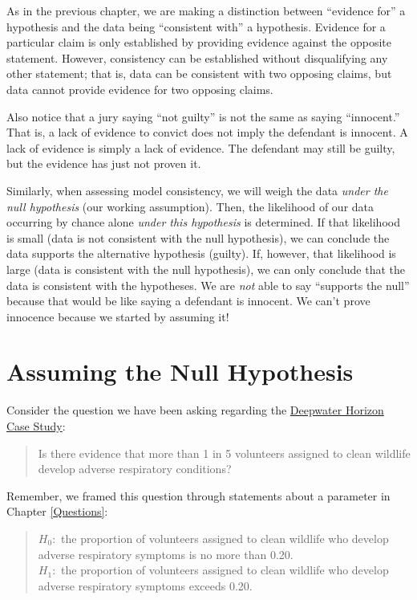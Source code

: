 \documentclass[]{book}
\theoremstyle{plain}
\theoremstyle{mydefn}
\theoremstyle{myexmpl}
\theoremstyle{remark}
\begin{document}
As in the previous chapter, we are making a distinction between
``evidence for'' a hypothesis and the data being ``consistent with'' a
hypothesis. Evidence for a particular claim is only established by
providing evidence against the opposite statement. However, consistency
can be established without disqualifying any other statement; that is,
data can be consistent with two opposing claims, but data cannot provide
evidence for two opposing claims.

Also notice that a jury saying ``not guilty'' is not the same as saying
``innocent.'' That is, a lack of evidence to convict does not imply the
defendant is innocent. A lack of evidence is simply a lack of evidence.
The defendant may still be guilty, but the evidence has just not proven
it.

Similarly, when assessing model consistency, we will weigh the data
\emph{under the null hypothesis} (our working assumption). Then, the
likelihood of our data occurring by chance alone \emph{under this
hypothesis} is determined. If that likelihood is small (data is not
consistent with the null hypothesis), we can conclude the data supports
the alternative hypothesis (guilty). If, however, that likelihood is
large (data is consistent with the null hypothesis), we can only
conclude that the data is consistent with the hypotheses. We are
\emph{not} able to say ``supports the null'' because that would be like
saying a defendant is innocent. We can't prove innocence because we
started by assuming it!

\section{Assuming the Null
Hypothesis}\label{assuming-the-null-hypothesis}

Consider the question we have been asking regarding the
\protect\hyperlink{CaseDeepwater}{Deepwater Horizon Case Study}:

\begin{quote}
Is there evidence that more than 1 in 5 volunteers assigned to clean
wildlife develop adverse respiratory conditions?
\end{quote}

Remember, we framed this question through statements about a parameter
in Chapter \ref{Questions}:

\begin{quote}
\(H_0:\) the proportion of volunteers assigned to clean wildlife who
develop adverse respiratory symptoms is no more than 0.20.\\
\(H_1:\) the proportion of volunteers assigned to clean wildlife who
develop adverse respiratory symptoms exceeds 0.20.
\end{quote}
\end{document}
